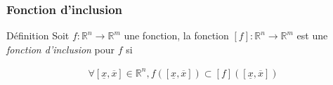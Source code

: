 \documentclass{beamer}
\begin{document}
\begin{frame}
    \frametitle{Fonction d'inclusion}

    \begin{block}{Définition}
        Soit $f : \mathbb{R}^n \rightarrow \mathbb{R}^m$ une fonction, la fonction $[f] : \mathbb{R}^n \rightarrow \mathbb{R}^m$ est une \textit{fonction d'inclusion} pour $f$ si

        \begin{align}
            \forall[\underline{x}, \overline{x}] \in \mathbb{R}^n , f([\underline{x}, \overline{x}]) \subset [f]([\underline{x}, \overline{x}])
        \end{align}
    \end{block}

\end{frame}
\end{document}
